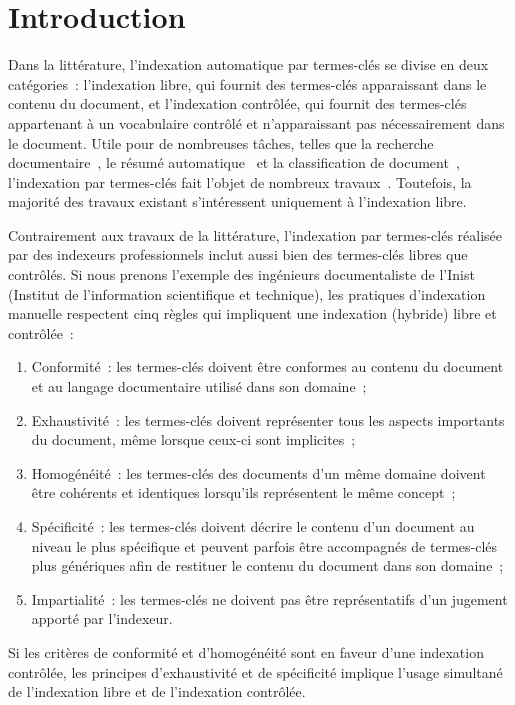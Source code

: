 \section{Introduction}
\label{sec:main:domain_specific_keyphrase_annotation-introduction}
  Dans la littérature, l'indexation automatique par termes-clés se divise en
  deux catégories~: l'indexation libre, qui fournit des termes-clés apparaissant
  dans le contenu du document, et l'indexation contrôlée, qui fournit des
  termes-clés appartenant à un vocabulaire contrôlé et n'apparaissant pas
  nécessairement dans le document. Utile pour de nombreuses tâches, telles que
  la recherche documentaire~, le résumé automatique~ et la
  classification de document~, l'indexation par termes-clés fait
  l'objet de nombreux travaux~. Toutefois, la majorité des travaux
  existant s'intéressent uniquement à l'indexation libre.
  
  Contrairement aux travaux de la littérature, l'indexation par termes-clés
  réalisée par des indexeurs professionnels inclut aussi bien des termes-clés
  libres que contrôlés. Si nous prenons l'exemple des ingénieurs documentaliste
  de l'Inist (Institut de l'information scientifique et technique), les
  pratiques d'indexation manuelle respectent cinq règles qui impliquent une
  indexation (hybride) libre et contrôlée~:
  \begin{enumerate}
    \item{Conformité~: les termes-clés doivent être conformes au contenu du
          document et au langage documentaire utilisé dans son domaine~;}
    \item{Exhaustivité~: les termes-clés doivent représenter tous les
          aspects importants du document, même lorsque ceux-ci sont
          implicites~;}
    \item{Homogénéité~: les termes-clés des documents d'un même domaine
          doivent être cohérents et identiques lorsqu'ils représentent le
          même concept~;}
    \item{Spécificité~: les termes-clés doivent décrire le contenu d'un
          document au niveau le plus spécifique et peuvent parfois être
          accompagnés de termes-clés plus génériques afin de restituer le
          contenu du document dans son domaine~;}
    \item{Impartialité~: les termes-clés ne doivent pas être représentatifs
          d'un jugement apporté par l'indexeur.}
  \end{enumerate}
  Si les critères de conformité et d'homogénéité sont en faveur d'une indexation
  contrôlée, les principes d'exhaustivité et de spécificité implique l'usage
  simultané de l'indexation libre et de l'indexation contrôlée.

